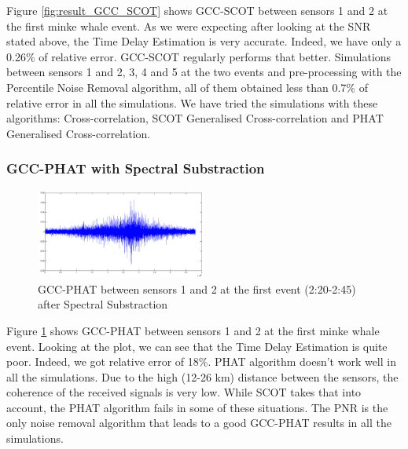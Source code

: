       Figure \ref{fig:result_GCC_SCOT} shows GCC-SCOT between sensors 1 and 2 at the first minke whale event. As we were expecting after looking at the SNR stated above, the Time Delay Estimation is very accurate. Indeed, we have only a 0.26\% of relative error. GCC-SCOT regularly performs that better. Simulations between sensors 1 and 2, 3, 4 and 5 at the two events and pre-processing with the Percentile Noise Removal algorithm, all of them obtained less than 0.7\% of relative error in all the simulations. We have tried the simulations with these algorithms: Cross-correlation, SCOT Generalised Cross-correlation and PHAT Generalised Cross-correlation.
  
    \subsubsection{GCC-PHAT with Spectral Substraction}
    
    \begin{figure}[htb]
      \begin{center}
	      \includegraphics[width=0.5\textwidth]{figures/6gcc_Phat_SS_12_1.png}
      \end{center}
      \caption{GCC-PHAT between sensors 1 and 2 at the first event (2:20-2:45) after Spectral Substraction}
      \label{fig:result_GCC_PHAT}
    \end{figure}
      
    Figure \ref{fig:result_GCC_PHAT} shows GCC-PHAT between sensors 1 and 2 at the first minke whale event. Looking at the plot, we can see that the Time Delay Estimation is quite poor. Indeed, we got relative error of 18\%. PHAT algorithm doesn't work well in all the simulations. Due to the high (12-26 km) distance between the sensors, the coherence of the received signals is very low. While SCOT takes that into account, the PHAT algorithm fails in some of these situations. The PNR is the only noise removal algorithm that leads to a good GCC-PHAT results in all the simulations.
